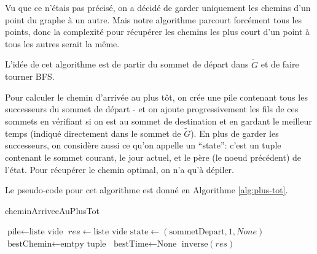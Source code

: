 Vu que ce n'étais pas précisé, on a décidé de garder uniquement les chemins d'un
point du graphe à un autre. Mais notre algorithme parcourt forcément tous les
points, donc la complexité pour récupérer les chemins les plus court d'un point
à tous les autres serait la même.

L'idée de cet algorithme est de partir du sommet de départ dans $\tilde{G}$ et
de faire tourner BFS.

Pour calculer le chemin d'arrivée au plus tôt, on crée une pile contenant tous
les successeurs du sommet de départ - et on ajoute progressivement les fils de
ces sommets en vérifiant si on est au sommet de destination et en gardant le
meilleur temps (indiqué directement dans le sommet de $\tilde{G}$). En plus de
garder les successeurs, on considère aussi ce qu'on appelle un ``state'': c'est
un tuple contenant le sommet courant, le jour actuel, et le père (le noeud
précédent) de l'état. Pour récupérer le chemin optimal, on n'a qu'à dépiler.

Le pseudo-code pour cet algorithme est donné en Algorithme \ref{alg:plus-tot}.

\begin{algorithm}[h!]
\caption{cheminArriveeAuPlusTot}\label{alg:plus-tot}

$\text{pile} \gets \text{liste vide}$\;
$res \gets \text{liste vide}$\;
$\text{state} \gets (\text{sommetDepart}, 1, None)$\;
$\text{bestChemin} \gets \text{emtpy tuple}$\;
$\text{bestTime} \gets \text{None}$\;
$\text{inverse}(res)$\;
\end{algorithm}


